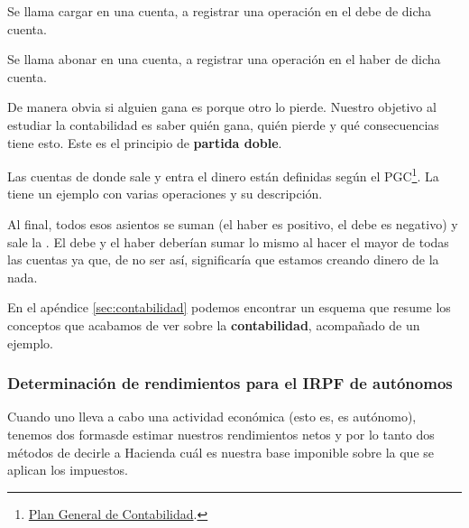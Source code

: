 \documentclass[nochap,palatino,shortheader]{apuntes}
\newcommand{\study}[1]{#1} \newcommand{\substudy}[1]{#1}
\begin{document}
Se llama \substudy{cargar} en una cuenta, a registrar una operación en el \substudy{debe} de dicha cuenta.

Se llama \substudy{abonar} en una cuenta, a registrar una operación en el \substudy{haber} de dicha cuenta.

De manera obvia si alguien gana es porque otro lo pierde. Nuestro objetivo al estudiar la contabilidad es saber \study{quién gana}, \study{quién pierde} y qué consecuencias tiene esto. Este es el principio de \textbf{\study{partida doble}}.

Las cuentas de donde sale y entra el dinero están definidas según el PGC\footnote{\href{https://www.boe.es/boe/dias/2007/11/20/pdfs/C00001-00152.pdf}{Plan General de Contabilidad}.}. La  tiene un ejemplo con varias operaciones y su descripción.


Al final, todos esos asientos se suman (el haber es positivo, el debe es negativo) y sale la . El debe y el haber deberían sumar lo mismo al hacer el mayor de todas las cuentas ya que, de no ser así, significaría que estamos creando dinero de la nada.

En el apéndice \ref{sec:contabilidad} podemos encontrar un esquema que resume los conceptos que acabamos de ver sobre la \textbf{contabilidad}, acompañado de un ejemplo.

\subsubsection{Determinación de rendimientos para el IRPF de autónomos}

Cuando uno lleva a cabo una actividad económica (esto es, es autónomo), tenemos dos formas\footnotemark de estimar nuestros rendimientos netos y por lo tanto dos métodos de decirle a Hacienda cuál es nuestra base imponible sobre la que se aplican los impuestos.

\end{document}
